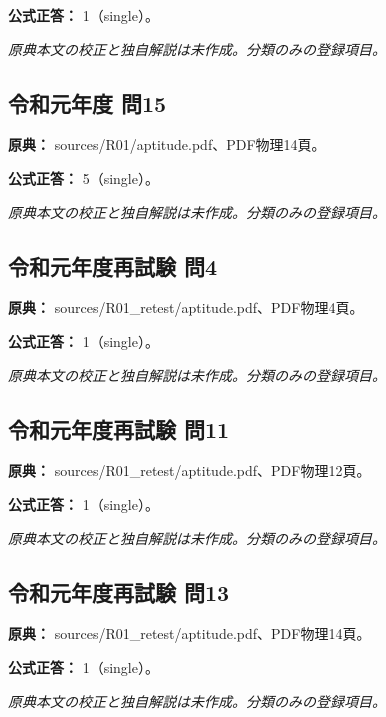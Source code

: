 \textbf{公式正答：} 1（single）。

\par\textit{原典本文の校正と独自解説は未作成。分類のみの登録項目。}

\subsection{令和元年度 問15}
\label{q:r01-reg-apt-15}

\noindent\textbf{原典：} sources/R01/aptitude.pdf、PDF物理14頁。

\textbf{公式正答：} 5（single）。

\par\textit{原典本文の校正と独自解説は未作成。分類のみの登録項目。}

\subsection{令和元年度再試験 問4}
\label{q:r01-ret-apt-04}

\noindent\textbf{原典：} sources/R01\_retest/aptitude.pdf、PDF物理4頁。

\textbf{公式正答：} 1（single）。

\par\textit{原典本文の校正と独自解説は未作成。分類のみの登録項目。}

\subsection{令和元年度再試験 問11}
\label{q:r01-ret-apt-11}

\noindent\textbf{原典：} sources/R01\_retest/aptitude.pdf、PDF物理12頁。

\textbf{公式正答：} 1（single）。

\par\textit{原典本文の校正と独自解説は未作成。分類のみの登録項目。}

\subsection{令和元年度再試験 問13}
\label{q:r01-ret-apt-13}

\noindent\textbf{原典：} sources/R01\_retest/aptitude.pdf、PDF物理14頁。

\textbf{公式正答：} 1（single）。

\par\textit{原典本文の校正と独自解説は未作成。分類のみの登録項目。}

